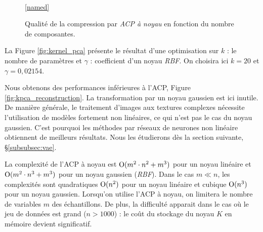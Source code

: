 \begin{figure}[hbtp]
    \centering
    \begin{adjustbox}{width=0.80\textwidth}
    \end{adjustbox}
    \\
    \ref{named}
    \caption{Qualité de la compression par \textit{ACP à noyau} en fonction du nombre de composantes.}
    \label{fig:kpca_plot}
\end{figure}

La Figure \ref{fig:kernel_pca} présente le résultat d'une optimisation sur $k$ : le nombre de paramètres et $\gamma$ : coefficient d'un noyau \textit{RBF}. On choisira ici $k = 20$ et $\gamma = 0,02154$.

Nous obtenons des performances inférieures à l'ACP, Figure \ref{fig:kpca_reconstruction}.
La transformation par un noyau gaussien est ici inutile.
De manière générale, le traitement d'images aux textures complexes nécessite l'utilisation de modèles fortement non linéaires, ce qui n'est pas le cas du noyau gaussien.
C'est pourquoi les méthodes par réseaux de neurones non linéaire obtiennent de meilleurs résultats.
Nous les étudierons dès la section suivante, §\ref{subsubsec:vae}.

La complexité de l'ACP à noyau est $\operatorname{O}(m^{2} \cdot n^2+m^{3})$ pour un noyau linéaire et $\operatorname{O}(m^{2} \cdot n^3+m^{3})$ pour un noyau gaussien (\textit{RBF}).
Dans le cas $m \ll n$, les complexités sont quadratiques $\operatorname{O}(n^2)$ pour un noyau linéaire et cubique $\operatorname{O}(n^3)$ pour un noyau gaussien.
Lorsqu'on utilise l'ACP à noyau, on limitera le nombre de variables $m$ des échantillons.
De plus, la difficulté apparait dans le cas où le jeu de données est grand ($n > 1000$) : le coût du stockage du noyau $K$ en mémoire devient significatif.

